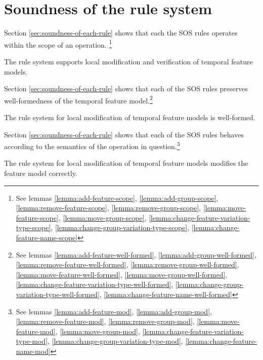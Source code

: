 \section{Soundness of the rule system}
Section \vref{sec:soundness-of-each-rule} shows that each the SOS rules operates within the scope of an operation. \footnote{See lemmas \vref{lemma:add-feature-scope}, \vref{lemma:add-group-scope}, \vref{lemma:remove-feature-scope}, \vref{lemma:remove-group-scope}, \vref{lemma:move-feature-scope}, \vref{lemma:move-group-scope}, \vref{lemma:change-feature-variation-type-scope}, \vref{lemma:change-group-variation-type-scope}, \vref{lemma:change-feature-name-scope}}
\\
\begin{theorem}
  The rule system supports local modification and verification of temporal feature models.
\end{theorem}

Section \vref{sec:soundness-of-each-rule} shows that each of the SOS rules preserves well-formedness of the temporal feature model.\footnote{See lemmas \vref{lemma:add-feature-well-formed}, \vref{lemma:add-group-well-formed}, \vref{lemma:remove-feature-well-formed}, \vref{lemma:remove-group-well-formed}, \vref{lemma:move-feature-well-formed}, \vref{lemma:move-group-well-formed}, \vref{lemma:change-feature-variation-type-well-formed}, \vref{lemma:change-group-variation-type-well-formed}, \vref{lemma:change-feature-name-well-formed}}
\\
\begin{theorem}
  The rule system for local modification of temporal feature models is well-formed.
\end{theorem}

Section \vref{sec:soundness-of-each-rule} shows that each of the SOS rules behaves according to the semantics of the operation in question.\footnote{See lemmas \vref{lemma:add-feature-mod}, \vref{lemma:add-group-mod}, \vref{lemma:remove-feature-mod}, \vref{lemma:remove-group-mod}, \vref{lemma:move-feature-mod}, \vref{lemma:move-group-mod}, \vref{lemma:change-feature-variation-type-mod}, \vref{lemma:change-group-variation-type-mod}, \vref{lemma:change-feature-name-mod}}
\\
\begin{theorem}
  The rule system for local modification of temporal feature models modifies the feature model correctly.
\end{theorem}
